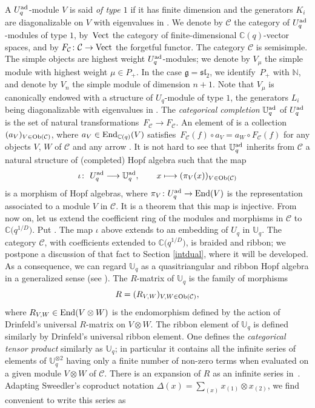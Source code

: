 \documentclass[pdftex]{sigma}
\numberwithin{equation}{section}
\theoremstyle{definition}
\newcommand{\mUq}{\mathbb{U}_q}
\newcommand{\mc}{\mathbb{C}}
\newcommand{\mz}{\mathbb{Z}}
\newcommand{\ra}{\rightarrow}
\begin{document}
A $U_q^{\rm ad}$-module $V$ is said {\it of type $1$} if it has finite dimension and the generators $K_i$ are diagonalizable on $V$ with eigenvalues in \smash{$q_i^{\mz}$}. We denote by $\mathcal{C}$ the category of $U_q^{\rm ad}$-modules of type $1$, by~${\rm Vect}$ the category of finite-dimensional $\mc(q)$-vector spaces, and by $F_{\mathcal C}\colon{\mathcal C}\to {\rm Vect}$ the forgetful functor. The category $\mathcal{C}$ is semisimple. The simple objects are highest weight $U_q^{\rm ad}$-modules; we denote by $V_\mu$ the simple module with highest weight $\mu\in P_+$. In the case $\mathfrak{g}={\mathfrak{sl}_2}$, we identify~$P_+$ with $\mathbb{N}$, and denote by $V_n$ the simple module of dimension $n+1$. Note that $V_\mu$ is canonically endowed with a structure of $U_q$-module of type $1$, the generators $L_i$ being diagonalizable with eigenvalues in \smash{$q_i^{\mz/D}$}. The {\it categorical completion} $\mUq^{\rm ad}$ of $U_q^{\rm ad}$ is the set of natural transformations~${F_{\mathcal C}\ra F_{\mathcal C}}$. An element of \smash{$\mUq^{\rm ad}$} is a collection $(a_V)_{V\in {\rm Ob}(\mathcal{C})}$, where $a_V\in {\rm End}_{\mc(q)}(V)$ satisfies~${F_{\mathcal C}(f)\circ a_V=a_W\circ F_{\mathcal C}(f)}$ for any objects $V$, $W$ of $\mathcal{C}$ and any arrow . It is not hard to see that $\mUq^{\rm ad}$ inherits from $\mathcal{C}$ a natural structure of (completed) Hopf algebra such that the map
\begin{gather}\label{defiota}
\iota\colon\ U_q^{\rm ad} \longrightarrow \mUq^{\rm ad}, \qquad x\longmapsto(\pi_V(x))_{V\in {\rm Ob}(\mathcal{C})}
\end{gather}
is a morphism of Hopf algebras, where $\pi_V\colon U_q^{\rm ad} \ra {\rm End}(V)$ is the representation associated to a module $V$ in $\mathcal{C}$. It is a theorem that this map is injective. From now on, let us extend the coefficient ring of the modules and morphisms in $\mathcal{C}$ to $\mc\big(q^{1/D}\big)$. Put \smash{$\mUq = \mUq^{\rm ad} \bigotimes_{\mc(q)} \mc\big(q^{1/D}\big)$}.
The map $\iota$ above extends to an embedding of $U_q$ in $\mUq$. The category $\mathcal{C}$, with coefficients extended to $\mc\big(q^{1/D}\big)$, is braided and ribbon; we postpone a discussion of that fact to Section \ref{intdual}, where it will be developed. As a consequence, we can regard $\mUq$ as a quasitriangular and ribbon Hopf algebra in a generalized sense (see \cite{BR}). The $R$-matrix of $\mUq$ is the family of morphisms
\[R = (R_{V,W})_{V,W\in {\rm Ob}(\mathcal{C})},\]
where $R_{V,W}\in {\rm End}(V\otimes W)$ is the endomorphism defined by the action of Drinfeld's universal $R$-matrix on $V\otimes W$. The ribbon element of $\mUq$ is defined similarly by Drinfeld's universal ribbon element. One defines the {\it categorical tensor product} \smash{$\mUq^{\hat{\otimes} 2}$} similarly as $\mUq$; in particular it contains all the infinite series of elements of $\mUq^{\otimes 2}$ having only a finite number of non-zero terms when evaluated on a given module $V\otimes W$ of $\mathcal{C}$. There is an expansion of $R$ as an infinite series in~\smash{$\mUq^{\hat{\otimes} 2}$}. Adapting Sweedler's coproduct notation $ \Delta(x)=\sum_{(x)}x_{(1)}\otimes x_{(2)}$, we find convenient to write this series as
\end{document}
